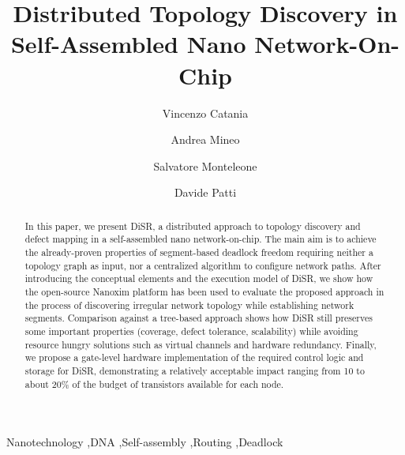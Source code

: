 \documentclass[preprint]{elsarticle}
\newcommand{\disr}{{\sf DiSR}}
\begin{document}
\begin{frontmatter}

\title{Distributed Topology Discovery in Self-Assembled Nano Network-On-Chip}

\author{Vincenzo Catania}
\author{Andrea Mineo}
\author{Salvatore Monteleone}
\author{Davide Patti}
\address{DIEEI, University of Catania, v.le Andrea Doria 6, 95125 Catania, Italy}






\begin{abstract}
In this paper, we present \disr{}, a distributed approach to topology
discovery and defect mapping in a self-assembled nano
network-on-chip. The main aim is to achieve the already-proven
properties of segment-based deadlock freedom requiring neither 
a topology graph as input, nor a centralized algorithm to
configure network paths.  After introducing the conceptual elements
and the execution model of \disr{}, we show how the open-source Nanoxim
platform has been used to evaluate the proposed approach in the
process of discovering irregular network topology while establishing
network segments. Comparison against a tree-based approach shows how
\disr{} still preserves some important properties (coverage, defect
tolerance, scalability) while avoiding resource hungry solutions such
as virtual channels and hardware redundancy. Finally, we propose a
gate-level hardware implementation of the required control logic and
storage for \disr{}, demonstrating a relatively acceptable impact
ranging from 10 to about 20\% of the budget of transistors available
for each node.
\end{abstract}

\begin{keyword}
Nanotechnology \sep DNA \sep Self-assembly \sep Routing \sep Deadlock
\end{keyword}
\end{frontmatter}
\end{document}
